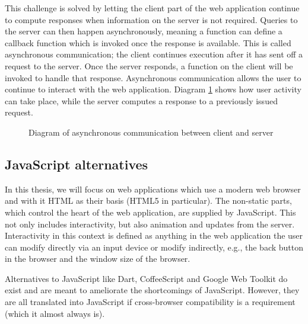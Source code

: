 \documentclass[thesis.tex]{subfiles}
\begin{document}
This challenge is solved by letting the client part of the web application
continue to compute responses when information on the server is not required.
Queries to the server can then happen asynchronously, meaning a function can
define a callback function which is invoked once the response is available. This
is called asynchronous communication; the client continues execution after it
has sent off a request to the server. Once the server responds, a function on
the client will be invoked to handle that response.
Asynchronous communication allows the user to continue to interact with the
web application. Diagram \ref{fig:asynchronous} shows how user activity can
take place, while the server computes a response to a previously issued request.

\begin{figure}
	\centering
	\resizebox{\linewidth}{!}{}
	\caption{Diagram of asynchronous communication between client and server}
	\label{fig:asynchronous}
\end{figure}

\subsection{JavaScript alternatives}
\label{sec:javascript-alts}
In this thesis, we will focus on web applications which use a
modern web browser and with it HTML as their basis (HTML5 in particular).
The non-static parts, which control the heart of the web application,
are supplied by JavaScript. This not only includes interactivity, but also
animation and updates from the server.
Interactivity in this context is defined as anything in the web application
the user can modify directly via an input device or modify indirectly, e.g.,
the back button in the browser and the window size of the browser.

Alternatives to JavaScript like Dart, CoffeeScript and Google Web Toolkit
do exist and are meant to ameliorate the shortcomings of JavaScript. 
However, they are all translated into JavaScript if cross-browser
compatibility is a requirement (which it almost always is).
\end{document}
